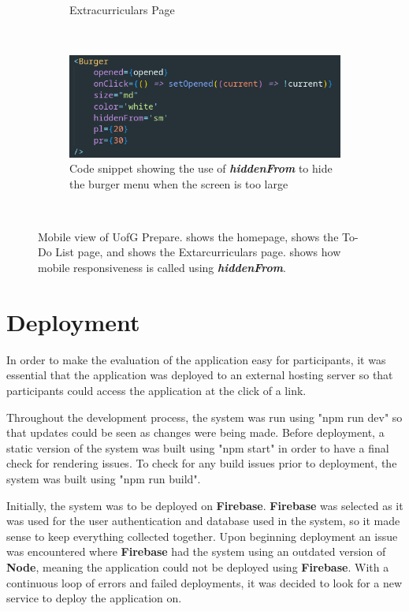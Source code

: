 \documentclass{l4proj}
\begin{document}
\begin{figure}[ht]
\begin{subfigure}[b]{0.3\textwidth}
        \caption{Extracurriculars Page}
        \label{fig:mobileExtra}
    \end{subfigure}
    ~ %
    \begin{subfigure}[b]{0.6\textwidth}
        \includegraphics[width=\textwidth]{images/hiddenFrom.pdf}
        \caption{Code snippet showing the use of \textit{\textbf{hiddenFrom}} to hide the burger menu when the screen is too large}
        \label{fig:hiddenFrom}
    \end{subfigure}
    ~ %
    \caption{Mobile view of UofG Prepare.  shows the homepage,   shows the To-Do List page,  and  shows the Extarcurriculars page.  shows how mobile responsiveness is called using \textbf{\textit{hiddenFrom}}.
    }\label{fig:mobile}
\end{figure}

\section{Deployment}
In order to make the evaluation of the application easy for participants,  it was essential that the application was deployed to an external hosting server so that participants could access the application at the click of a link. 

Throughout the development process,  the system was run using "npm run dev" so that updates could be seen as changes were being made. Before deployment,  a static version of the system was built using "npm start" in order to have a final check for rendering issues. To check for any build issues prior to deployment,  the system was built using "npm run build".

Initially,  the system was to be deployed on \textbf{Firebase}. \textbf{Firebase} was selected as it was used for the user authentication and database used in the system,  so it made sense to keep everything collected together. Upon beginning deployment an issue was encountered where \textbf{Firebase} had the system using an outdated version of \textbf{Node},  meaning the application could not be deployed using \textbf{Firebase}. With a continuous loop of errors and failed deployments,  it was decided to look for a new service to deploy the application on.
\end{document}
